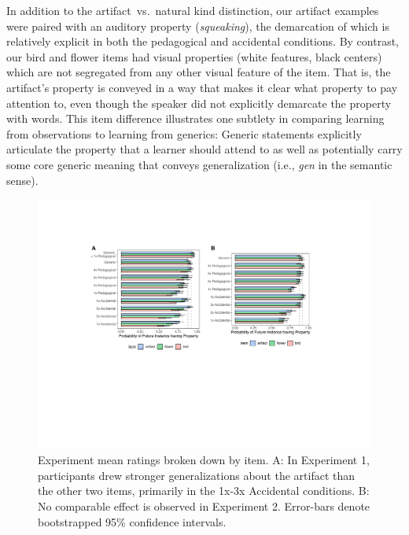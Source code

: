 \documentclass[10pt,letterpaper]{article}
\begin{document}
In addition to the artifact~vs.~natural kind distinction, our artifact examples were paired with an auditory property (\emph{squeaking}), the demarcation of which is relatively explicit in both the pedagogical and accidental conditions. 
By contrast, our bird and flower items had visual properties (white features, black centers) which are not segregated from any other visual feature of the item.
That is, the artifact's property is conveyed in a way that makes it clear what property to pay attention to,  even though the speaker did not explicitly demarcate the property with words. 
This item difference illustrates one subtlety in comparing learning from observations to learning from generics: Generic statements explicitly articulate the property that a learner should attend to as well as potentially carry some core generic meaning that conveys generalization (i.e., \emph{gen} in the semantic sense).


\begin{figure}[t]
\begin{center}
\includegraphics[width=\linewidth]{figs/genex_expts_itembars.pdf}
\end{center}
\caption{Experiment mean ratings broken down by item. A: In Experiment 1, participants drew stronger generalizations about the artifact than the other two items, primarily in the 1x-3x Accidental conditions. B: No comparable effect is observed in Experiment 2. Error-bars denote bootstrapped 95\% confidence intervals.}
\label{fig:results1item}
\end{figure}
\end{document}
